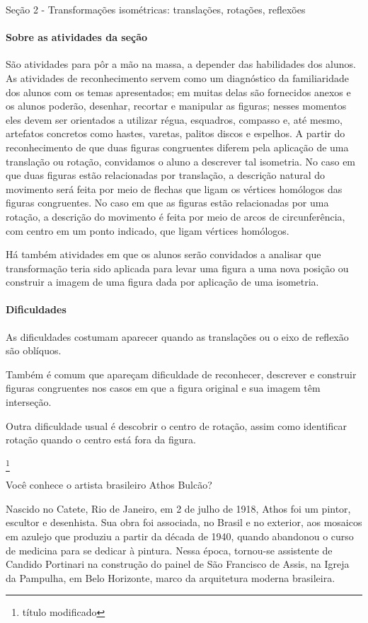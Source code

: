 \begin{paginatexto}{Seção 2 - Transformações isométricas: translações, rotações, reflexões}
\paragraph{Sobre as atividades da seção}
São atividades para pôr a mão na massa, a depender das habilidades dos alunos. As atividades de reconhecimento servem como um diagnóstico da familiaridade dos alunos com os temas apresentados; em muitas delas são fornecidos anexos e os alunos poderão, desenhar, recortar e manipular as figuras; nesses momentos eles devem ser orientados a utilizar régua, esquadros, compasso e, até mesmo, artefatos concretos como hastes, varetas, palitos discos e espelhos. A partir do reconhecimento de que duas figuras congruentes diferem pela aplicação de uma translação ou rotação, convidamos o aluno a descrever tal isometria. No caso em que duas figuras estão relacionadas por translação, a descrição natural do movimento será feita por meio de flechas que ligam os vértices homólogos das figuras congruentes. No caso em que as figuras estão relacionadas por uma rotação, a descrição do movimento é feita por meio de arcos de circunferência, com centro em um ponto indicado, que ligam vértices homólogos.  

Há também atividades em que os alunos serão convidados a analisar que transformação teria sido aplicada para levar uma figura a uma nova posição ou construir a imagem de uma figura dada por aplicação de uma isometria.

\paragraph{Dificuldades}
As dificuldades costumam aparecer quando as translações ou o eixo de reflexão são oblíquos. 

Também é comum que apareçam dificuldade de reconhecer, descrever e construir figuras congruentes nos casos em que a figura original e sua imagem têm interseção.

Outra dificuldade usual é descobrir o centro de rotação, assim como identificar rotação quando o centro está fora da figura.

\end{paginatexto}

\footnote{título modificado}



Você conhece o artista brasileiro Athos Bulcão?

Nascido no Catete, Rio de Janeiro, em 2 de julho de 1918, Athos foi um pintor, escultor e desenhista. Sua obra foi associada, no Brasil e no exterior, aos mosaicos em azulejo que produziu a partir da década de 1940, quando abandonou o curso de medicina para se dedicar à pintura. Nessa época, tornou-se assistente de Candido Portinari na construção do painel de São Francisco de Assis, na Igreja da Pampulha, em Belo Horizonte, marco da arquitetura moderna brasileira.

